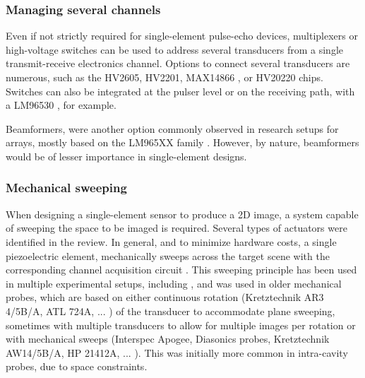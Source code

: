 \documentclass{article}
\begin{document}
\subsubsection{Managing several channels}

Even if not strictly required for single-element pulse-echo devices, multiplexers or high-voltage switches can be used to address several transducers from a single transmit-receive electronics channel. Options to connect several transducers are numerous, such as the HV2605, HV2201, MAX14866 \cite{enwia_open-source_2019, pashaei_flexible_2020, enwia_open-source_2020}, or HV20220 \cite{li_new_2014} chips. Switches can also be integrated at the pulser level \cite{worthing_using_2016, hidayat_determination_2020} or on the receiving path, with a LM96530 \cite{gwirc_desarrollo_2019, vasudevan_programmable_2014, roman_open-source_2018}, for example.

Beamformers, were another option commonly observed in research setups for arrays, mostly based on the LM965XX family \cite{gwirc_desarrollo_2019, yu_low-power_2012, roman_open-source_2018, bharath_fpga-based_2015, roman_open-source_2018}. However, by nature, beamformers would be of lesser importance in single-element designs.

\subsubsection{Mechanical sweeping}

When designing a single-element sensor to produce a 2D image, a system capable of sweeping the space to be imaged is required. Several types of actuators were identified in the review. In general, and to minimize hardware costs, a single piezoelectric element, mechanically sweeps across the target scene with the corresponding channel acquisition circuit \cite{saijo_development_nodate}. This sweeping principle has been used in multiple experimental setups, including \cite{chang_low-cost_2009}, and was used in older mechanical probes, which are based on either continuous rotation (Kretztechnik AR3 4/5B/A, ATL 724A, ... ) of the transducer to accommodate plane sweeping, sometimes with multiple transducers to allow for multiple images per rotation or with mechanical sweeps (Interspec Apogee, Diasonics probes, Kretztechnik AW14/5B/A, HP 21412A, ... ). This was initially more common in intra-cavity probes, due to space constraints. 
\end{document}
